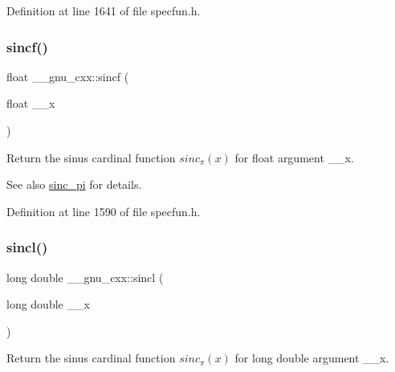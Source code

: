 Definition at line 1641 of file specfun.\+h.

\mbox{\label{group__gnu__math__spec__func_gaa87f0734cfe7823c932511ac2f0a876c}} 
\subsubsection{\texorpdfstring{sincf()}{sincf()}}
{\footnotesize\ttfamily float \+\_\+\+\_\+gnu\+\_\+cxx\+::sincf (\begin{DoxyParamCaption}\item[{float}]{\+\_\+\+\_\+x }\end{DoxyParamCaption})\hspace{0.3cm}{\ttfamily [inline]}}

Return the sinus cardinal function $ sinc_\pi(x) $ for {\ttfamily float} argument {\ttfamily \+\_\+\+\_\+x}.

\begin{DoxySeeAlso}{See also}
\hyperlink{group__gnu__math__spec__func_ga5195270024403b985e7d4f2f935f8779}{sinc\+\_\+pi} for details. 
\end{DoxySeeAlso}


Definition at line 1590 of file specfun.\+h.

\mbox{\label{group__gnu__math__spec__func_ga79a8fd931f5ad4f737e2931e636149ac}} 
\subsubsection{\texorpdfstring{sincl()}{sincl()}}
{\footnotesize\ttfamily long double \+\_\+\+\_\+gnu\+\_\+cxx\+::sincl (\begin{DoxyParamCaption}\item[{long double}]{\+\_\+\+\_\+x }\end{DoxyParamCaption})\hspace{0.3cm}{\ttfamily [inline]}}

Return the sinus cardinal function $ sinc_\pi(x) $ for {\ttfamily long double} argument {\ttfamily \+\_\+\+\_\+x}.

